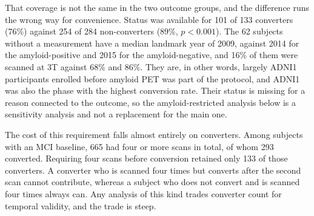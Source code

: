 \documentclass[blue]{ludusofficial}  %
\begin{document}
That coverage is not the same in the two outcome groups, and the difference runs the wrong way for convenience. Status was available for 101 of 133 converters (76\%) against 254 of 284 non-converters (89\%, $p<0.001$). The 62 subjects without a measurement have a median landmark year of 2009, against 2014 for the amyloid-positive and 2015 for the amyloid-negative, and 16\% of them were scanned at 3T against 68\% and 86\%. They are, in other words, largely ADNI1 participants enrolled before amyloid PET was part of the protocol, and ADNI1 was also the phase with the highest conversion rate. Their status is missing for a reason connected to the outcome, so the amyloid-restricted analysis below is a sensitivity analysis and not a replacement for the main one.

The cost of this requirement falls almost entirely on converters. Among subjects with an MCI baseline, 665 had four or more scans in total, of whom 293 converted. Requiring four scans before conversion retained only 133 of those converters. A converter who is scanned four times but converts after the second scan cannot contribute, whereas a subject who does not convert and is scanned four times always can. Any analysis of this kind trades converter count for temporal validity, and the trade is steep.
\end{document}
